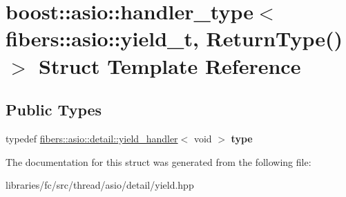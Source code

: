 \hypertarget{structboost_1_1asio_1_1handler__type_3_01fibers_1_1asio_1_1yield__t_00_01_return_type_07_08_01_4}{}\section{boost\+:\+:asio\+:\+:handler\+\_\+type$<$ fibers\+:\+:asio\+:\+:yield\+\_\+t, Return\+Type() $>$ Struct Template Reference}
\label{structboost_1_1asio_1_1handler__type_3_01fibers_1_1asio_1_1yield__t_00_01_return_type_07_08_01_4}
\subsection*{Public Types}
\begin{DoxyCompactItemize}
\item 
\mbox{\label{structboost_1_1asio_1_1handler__type_3_01fibers_1_1asio_1_1yield__t_00_01_return_type_07_08_01_4_a9a614a2cf3986b9444e37288453daa7d}} 
typedef \mbox{\hyperlink{classboost_1_1fibers_1_1asio_1_1detail_1_1yield__handler}{fibers\+::asio\+::detail\+::yield\+\_\+handler}}$<$ void $>$ {\bfseries type}
\end{DoxyCompactItemize}


The documentation for this struct was generated from the following file\+:\begin{DoxyCompactItemize}
\item 
libraries/fc/src/thread/asio/detail/yield.\+hpp\end{DoxyCompactItemize}
